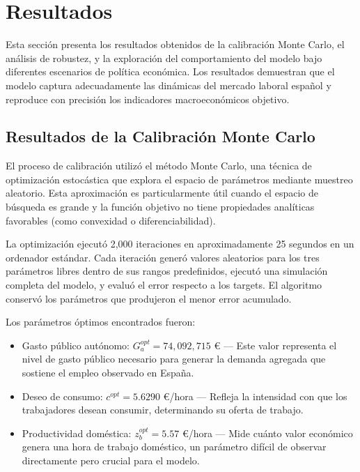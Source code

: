 \section{Resultados}

Esta sección presenta los resultados obtenidos de la calibración Monte Carlo, el análisis de robustez, y la exploración del comportamiento del modelo bajo diferentes escenarios de política económica. Los resultados demuestran que el modelo captura adecuadamente las dinámicas del mercado laboral español y reproduce con precisión los indicadores macroeconómicos objetivo.

\subsection{Resultados de la Calibración Monte Carlo}

El proceso de calibración utilizó el método Monte Carlo, una técnica de optimización estocástica que explora el espacio de parámetros mediante muestreo aleatorio. Esta aproximación es particularmente útil cuando el espacio de búsqueda es grande y la función objetivo no tiene propiedades analíticas favorables (como convexidad o diferenciabilidad).

La optimización ejecutó 2,000 iteraciones en aproximadamente 25 segundos en un ordenador estándar. Cada iteración generó valores aleatorios para los tres parámetros libres dentro de sus rangos predefinidos, ejecutó una simulación completa del modelo, y evaluó el error respecto a los targets. El algoritmo conservó los parámetros que produjeron el menor error acumulado.

Los parámetros óptimos encontrados fueron:

\begin{itemize}
    \item Gasto público autónomo: $G_a^{opt} = 74{,}092{,}715$ € --- Este valor representa el nivel de gasto público necesario para generar la demanda agregada que sostiene el empleo observado en España.
    \item Deseo de consumo: $c^{opt} = 5.6290$ €/hora --- Refleja la intensidad con que los trabajadores desean consumir, determinando su oferta de trabajo.
    \item Productividad doméstica: $z_b^{opt} = 5.57$ €/hora --- Mide cuánto valor económico genera una hora de trabajo doméstico, un parámetro difícil de observar directamente pero crucial para el modelo.
\end{itemize}

